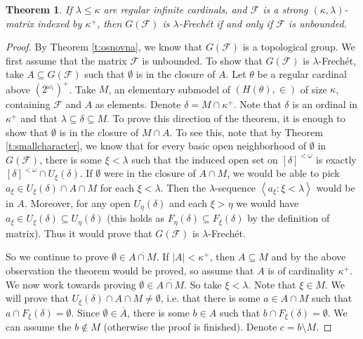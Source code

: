 \documentclass{amsart}
\theoremstyle{plain}
\newtheorem{theorem}{Theorem}[section]
\theoremstyle{definition}
\numberwithin{equation}{section}
\renewcommand{\d}{\delta}
\renewcommand{\k}{\kappa}
\renewcommand{\o}{\omega}
\renewcommand{\l}{\lambda}
\newcommand{\ps}{\emptyset}
\newcommand{\sst}{\subseteq}
\newcommand{\seq}[1]{\left<#1\right>}
\newcommand{\abs}[1]{\left\vert#1\right\vert}
\begin{document}
\begin{theorem}\label{t:frechet}
	If $\l\le\k$ are regular infinite cardinals, and $\mathcal F$ is a strong $(\k,\l)$-matrix indexed by $\k^+$, then 
	$G(\mathcal F)$ is $\l$-Frech\'et if and only if $\mathcal F$ is unbounded.
\end{theorem}
\begin{proof}
	By Theorem \ref{t:osnovna}, we know that $G(\mathcal F)$ is a topological group.
	We first assume that the matrix $\mathcal F$ is unbounded.
	To show that $G(\mathcal F)$ is $\l$-Frech\'et, take $A\sst G(\mathcal F)$ such that $\ps$ is in the closure of $A$.
	Let $\theta$ be a regular cardinal above $\left(2^{\o_1}\right)^+$.
	Take $M$, an elementary submodel of $(H(\theta),\in)$ of size $\k$, containing $\mathcal F$ and $A$ as elements.
	Denote $\d=M\cap \k^+$.
	Note that $\d$ is an ordinal in $\k^+$ and that $\l\sst\d\sst M$.
	To prove this direction of the theorem, it is enough to show that $\ps$ is in the closure of $M\cap A$.
	To see this, note that by Theorem \ref{t:smallcharacter}, we know that for every basic open neighborhood of $\ps$ in $G(\mathcal F)$, there is some $\xi<\l$ such that the induced open set on $[\d]^{<\o}$ is exactly $[\d]^{<\o}\cap U_{\xi}(\d)$.
	If $\ps$ were in the closure of $A\cap M$, we would be able to pick $a_{\xi}\in U_{\xi}(\d)\cap A\cap M$ for each $\xi<\l$.
	Then the $\l$-sequence $\seq{a_{\xi}:\xi<\l}$ would be in $A$.
	Moreover, for any open $U_{\eta}(\d)$ and each $\xi>\eta$ we would have $a_{\xi}\in U_{\xi}(\d)\sst U_{\eta}(\d)$ (this holds as $F_{\eta}(\d)\sst F_{\xi}(\d)$ by the definition of matrix).
	Thus it would prove that $G(\mathcal F)$ is $\l$-Frech\'et.

	So we continue to prove $\ps\in \overline{A\cap M}$.
	If $\abs{A}<\k^+$, then $A\sst M$ and by the above observation the theorem would be proved, so assume that $A$ is of cardinality $\k^+$.
	We now work towards proving $\ps\in\overline{A\cap M}$.
	So take $\xi<\l$.
	Note that $\xi\in M$.
	We will prove that $U_{\xi}(\d)\cap A\cap M\neq\ps$, i.e. that there is some $a\in A\cap M$ such that $a\cap F_{\xi}(\d)=\ps$.
	Since $\ps\in \overline{A}$, there is some $b\in A$ such that $b\cap F_{\xi}(\d)=\ps$.
	We can assume the $b\notin M$ (otherwise the proof is finished).
	Denote $c=b\setminus M$.
	

\end{proof}
\end{document}
